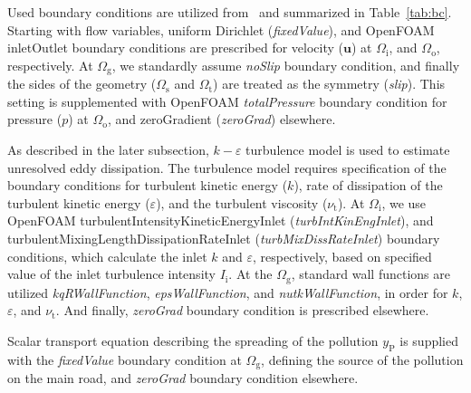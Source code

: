 Used boundary conditions are utilized from~\cite{kadaverugu21,Pantusheva22} and summarized in Table~\ref{tab:bc}. Starting with flow variables, uniform Dirichlet (\textit{fixedValue}), and OpenFOAM inletOutlet boundary conditions are prescribed for velocity ($\bm{u}$) at $\Omega_{\mathrm{i}}$, and $\Omega_{\mathrm{o}}$, respectively. At $\Omega_{\mathrm{g}}$, we standardly assume \textit{noSlip} boundary condition, and finally the sides of the geometry ($\Omega_{\mathrm{s}}$ and $\Omega_{\mathrm{t}}$) are treated as the symmetry (\textit{slip}). This setting is supplemented with OpenFOAM \textit{totalPressure} boundary condition for pressure ($p$) at $\Omega_{\mathrm{o}}$, and zeroGradient (\textit{zeroGrad}) elsewhere. 

As described in the later subsection, $k-\varepsilon$ turbulence model is used to estimate unresolved eddy dissipation. The turbulence model requires specification of the boundary conditions for turbulent kinetic energy ($k$), rate of dissipation of the turbulent kinetic energy ($\varepsilon$), and the turbulent viscosity ($\nu_{\mathrm{t}}$). At $\Omega_{\mathrm{i}}$, we use OpenFOAM turbulentIntensityKineticEnergyInlet (\textit{turbIntKinEngInlet}), and turbulentMixingLengthDissipationRateInlet (\textit{turbMixDissRateInlet}) boundary conditions, which calculate the inlet $k$ and $\varepsilon$, respectively, based on specified value of the inlet turbulence intensity $I_{\mathrm{i}}$. At the $\Omega_{\mathrm{g}}$, standard wall functions are utilized \textit{kqRWallFunction}, \textit{epsWallFunction}, and \textit{nutkWallFunction}, in order for $k$, $\varepsilon$, and $\nu_{\mathrm{t}}$. And finally, \textit{zeroGrad} boundary condition is prescribed elsewhere.

Scalar transport equation describing the spreading of the pollution $y_{\mathrm{P}}$ is supplied with the \textit{fixedValue} boundary condition at $\Omega_{\mathrm{g}}$, defining the source of the pollution on the main road, and \textit{zeroGrad} boundary condition elsewhere.

